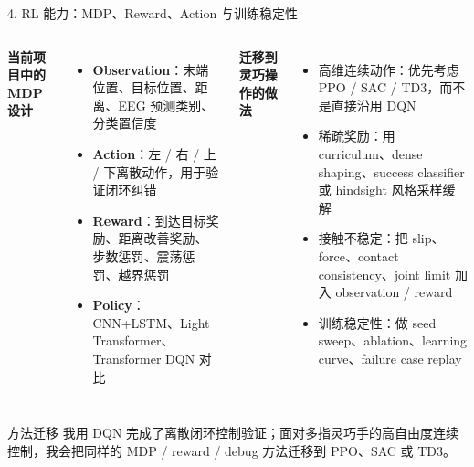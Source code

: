 \documentclass[UTF8,aspectratio=169,11pt]{ctexbeamer}
\begin{document}
\begin{frame}[shrink=8]{4. RL 能力：MDP、Reward、Action 与训练稳定性}

    \begin{columns}[T]
        \textbf{当前项目中的 MDP 设计}
        \begin{itemize}
            \item \textbf{Observation}：末端位置、目标位置、距离、EEG 预测类别、分类置信度
            \item \textbf{Action}：左 / 右 / 上 / 下离散动作，用于验证闭环纠错
            \item \textbf{Reward}：到达目标奖励、距离改善奖励、步数惩罚、震荡惩罚、越界惩罚
            \item \textbf{Policy}：CNN+LSTM、Light Transformer、Transformer DQN 对比
        \end{itemize}

        \textbf{迁移到灵巧操作的做法}
        \begin{itemize}
            \item 高维连续动作：优先考虑 PPO / SAC / TD3，而不是直接沿用 DQN
            \item 稀疏奖励：用 curriculum、dense shaping、success classifier 或 hindsight 风格采样缓解
            \item 接触不稳定：把 slip、force、contact consistency、joint limit 加入 observation / reward
            \item 训练稳定性：做 seed sweep、ablation、learning curve、failure case replay
        \end{itemize}
    \end{columns}

    \vspace{2mm}
    \begin{alertblock}{方法迁移}
        我用 DQN 完成了离散闭环控制验证；面对多指灵巧手的高自由度连续控制，我会把同样的 MDP / reward / debug 方法迁移到 PPO、SAC 或 TD3。
    \end{alertblock}
\end{frame}
\end{document}
